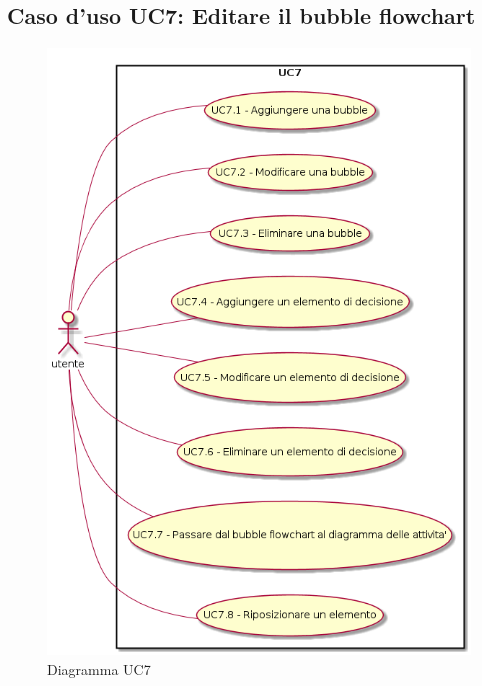 \documentclass[../AnalisiDeiRequisiti.tex]{subfiles}
\begin{document}
				\subsection{Caso d'uso UC7: Editare il bubble flowchart}\begin{figure} [H]
					\centering
					\includegraphics[scale=0.45]{./Figures/UC7.png}
					\caption{Diagramma UC7}\label{}
				\end{figure}
\end{document}
